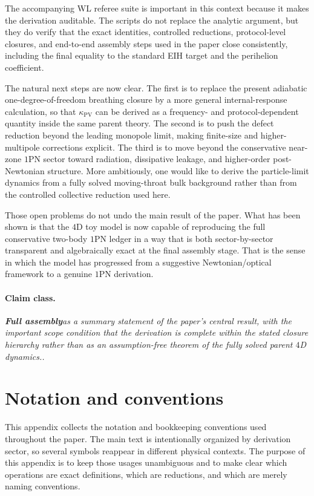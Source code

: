\documentclass[11pt]{article}
\newcommand{\kPV}{\kappa_{\mathrm{PV}}}
\newcommand{\FullMatch}{\textbf{Full assembly}}
\newcommand{\claimclass}[1]{\paragraph{Claim class.}\emph{#1.}}
\begin{document}
The accompanying WL referee suite is important in this context because it makes the
derivation auditable. The scripts do not replace the analytic argument, but they do verify
that the exact identities, controlled reductions, protocol-level closures, and end-to-end
assembly steps used in the paper close consistently, including the final equality to the
standard EIH target and the perihelion coefficient.

The natural next steps are now clear. The first is to replace the present adiabatic
one-degree-of-freedom breathing closure by a more general internal-response calculation,
so that \(\kPV\) can be derived as a frequency- and protocol-dependent quantity inside the
same parent theory. The second is to push the defect reduction beyond the leading monopole
limit, making finite-size and higher-multipole corrections explicit. The third is to move
beyond the conservative near-zone \(1\)PN sector toward radiation, dissipative leakage,
and higher-order post-Newtonian structure. More ambitiously, one would like to derive the
particle-limit dynamics from a fully solved moving-throat bulk background rather than from
the controlled collective reduction used here.

Those open problems do not undo the main result of the paper. What has been shown is that
the \(4\)D toy model is now capable of reproducing the full conservative two-body \(1\)PN
ledger in a way that is both sector-by-sector transparent and algebraically exact at the
final assembly stage. That is the sense in which the model has progressed from a
suggestive Newtonian/optical framework to a genuine \(1\)PN derivation.

\claimclass{\FullMatch as a summary statement of the paper's central result, with the
important scope condition that the derivation is complete within the stated closure
hierarchy rather than as an assumption-free theorem of the fully solved parent \(4\)D
dynamics.}

\appendix

\section{Notation and conventions}
\label{app:notation}

This appendix collects the notation and bookkeeping conventions used throughout the paper.
The main text is intentionally organized by derivation sector, so several symbols reappear
in different physical contexts. The purpose of this appendix is to keep those usages
unambiguous and to make clear which operations are exact definitions, which are reductions,
and which are merely naming conventions.
\end{document}
